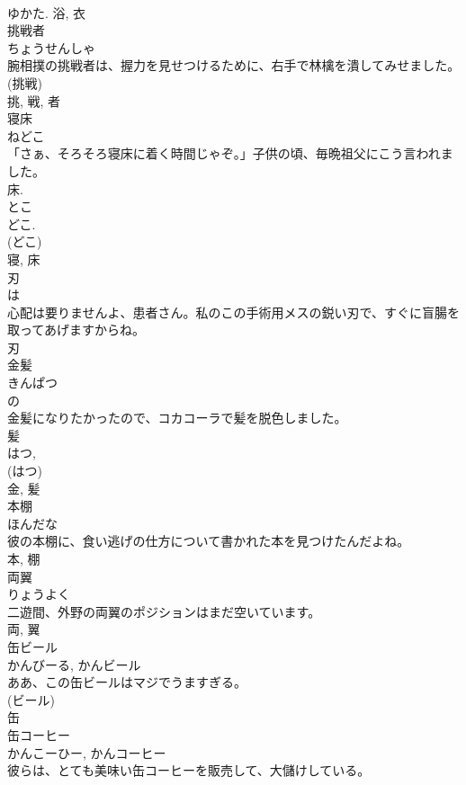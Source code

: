 \documentclass[8pt]{extreport}
\begin{document}
\begin{CJK}{UTF8}{min}
\\	ゆかた.	浴, 衣	
\\	挑戦者	
\\	ちょうせんしゃ	
\\	腕相撲の挑戦者は、握力を見せつけるために、右手で林檎を潰してみせました。	
\\	(挑戦) 
\\	挑, 戦, 者	
\\	寝床	
\\	ねどこ	
\\	「さぁ、そろそろ寝床に着く時間じゃぞ。」子供の頃、毎晩祖父にこう言われました。	
\\	床. 
\\	とこ 
\\	どこ. 
\\	(どこ) 
\\	寝, 床	
\\	刃	
\\	は	
\\	心配は要りませんよ、患者さん。私のこの手術用メスの鋭い刃で、すぐに盲腸を取ってあげますからね。	
\\	刃	
\\	金髪	
\\	きんぱつ	
\\	の 
\\	金髪になりたかったので、コカコーラで髪を脱色しました。	
\\	髪 
\\	はつ, 
\\	(はつ) 
\\	金, 髪	
\\	本棚	
\\	ほんだな	
\\	彼の本棚に、食い逃げの仕方について書かれた本を見つけたんだよね。	
\\	本, 棚	
\\	両翼	
\\	りょうよく	
\\	二遊間、外野の両翼のポジションはまだ空いています。	
\\	両, 翼	
\\	缶ビール	
\\	かんびーる, かんビール	
\\	ああ、この缶ビールはマジでうますぎる。	
\\	(ビール) 
\\	缶	
\\	缶コーヒー	
\\	かんこーひー, かんコーヒー	
\\	彼らは、とても美味い缶コーヒーを販売して、大儲けしている。	

\end{CJK}
\end{document}
